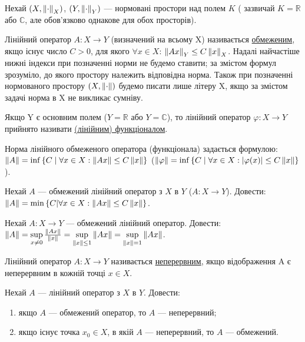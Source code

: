 
\begin{theory}
    Нехай $(X, \left\lVert\cdot\right\rVert_X)$, $(Y, \left\lVert\cdot\right\rVert_Y)$ --- нормовані простори над полем $K$ (
        зазвичай $K = 
    \mathbb{R}$ або $\mathbb{C}$, 
    але обов'язково однакове для обох просторів). 

    Лінійний оператор $A: X \rightarrow Y$ (визначений на всьому X) називається 
    \underline{обмеженим}, якщо існує число $C > 0$, для якого $\forall x \in X$: 
    $\left\lVert Ax\right\rVert_Y \leq C \left\lVert x\right\rVert_X$. Надалі найчастіше нижні індекси при позначенні норми 
    не будемо ставити; за змістом формул зрозуміло, до якого простору належить відповідна 
    норма. Також при позначенні нормованого простору $(X, \left\lVert\cdot\right\rVert)$ будемо писати лише 
    літеру X, якщо за змістом задачі норма в X не викликає сумніву. 

    Якщо Y є основним полем ($Y=\mathbb{R}$ або $Y = \mathbb{C}$), то лінійний оператор 
    $\varphi: X \rightarrow Y$ прийнято називати \underline{(лінійним) функціоналом}.

    Норма лінійного обмеженого оператора (функціонала) задається формулою: 
    $\left\lVert A\right\rVert = \inf\left\{C\;|\;\forall x \in X : \left\lVert Ax\right\rVert\leq C\left\lVert x\right\rVert \right\}$
    ($\left\lVert\varphi\right\rVert = \inf\left\{C \;|\; \forall x \in X : |\varphi(x)|\leq C\left\lVert x\right\rVert \right\}$).
\end{theory}

\begin{exercise}
    Нехай $A$ --- обмежений лінійний оператор з $X$ в $Y$ ($A: X \rightarrow Y$).
    Довести: $\left\lVert A\right\rVert = \min\left\{C|\forall x \in X : \left\lVert Ax\right\rVert \leq C\left\lVert x\right\rVert\right\}$.
\end{exercise}

\begin{exercise}
    Нехай $A: X \rightarrow Y$ --- обмежений лінійний оператор.
    Довести: $\left\lVert A\right\rVert = \sup\limits_{x \neq 0}\frac{\left\lVert Ax\right\rVert}{\left\lVert x\right\rVert} = 
    \sup\limits_{\left\lVert x\right\rVert \leq 1}\left\lVert Ax\right\rVert = \sup\limits_{\left\lVert x\right\rVert = 1}\left\lVert Ax\right\rVert$.
\end{exercise}

\begin{theory}
    Лінійний оператор $A: X \rightarrow Y$ називається \underline{неперервним}, якщо відображення 
    A є неперервним в кожній точці $x \in X$.
\end{theory}

\begin{exercise}
    Нехай $A$ --- лінійний оператор з $X$ в $Y$. Довести: 
    \begin{enumerate}[label=\alph*)]
        \item якщо $A$ --- обмежений оператор, то $A$ --- неперервний;
        \item якщо існує точка $x_0 \in X$, в якій $A$ --- неперервний, то $A$ --- обмежений.
    \end{enumerate}
\end{exercise}


